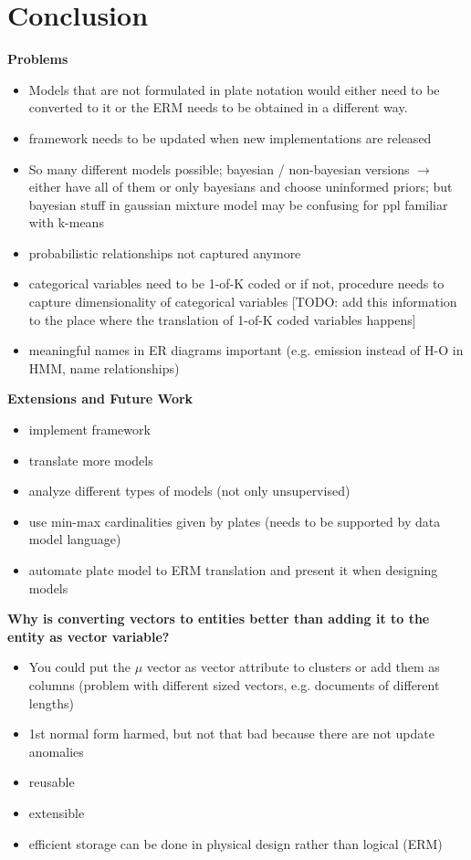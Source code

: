 \section{Conclusion}

\textbf{Problems}
\begin{itemize}
\item Models that are not formulated in plate notation would either need to be converted to it or the ERM needs to be obtained in a different way.
\item framework needs to be updated when new implementations are released
\item So many different models possible; bayesian / non-bayesian versions $\rightarrow$ either have all of them or only bayesians and choose uninformed priors; but bayesian stuff in gaussian mixture model may be confusing for ppl familiar with k-means
\item probabilistic relationships not captured anymore
\item categorical variables need to be 1-of-K coded or if not, procedure needs to capture dimensionality of categorical variables [TODO: add this information to the place where the translation of 1-of-K coded variables happens]
\item meaningful names in ER diagrams important (e.g. emission instead of H-O in HMM, name relationships)
\end{itemize}

\textbf{Extensions and Future Work}
\begin{itemize}
\item implement framework
\item translate more models
\item analyze different types of models (not only unsupervised)
\item use min-max cardinalities given by plates (needs to be supported by data model language)
\item automate plate model to ERM translation and present it when designing models
\end{itemize}

\textbf{Why is converting vectors to entities better than adding it to the entity as vector variable?}
\begin{itemize}
\item You could put the $\mu$ vector as vector attribute to clusters or add them as columns (problem with different sized vectors, e.g. documents of different lengths)
\item 1st normal form harmed, but not that bad because there are not update anomalies
\item reusable
\item extensible
\item efficient storage can be done in physical design rather than logical (ERM)
\end{itemize}

